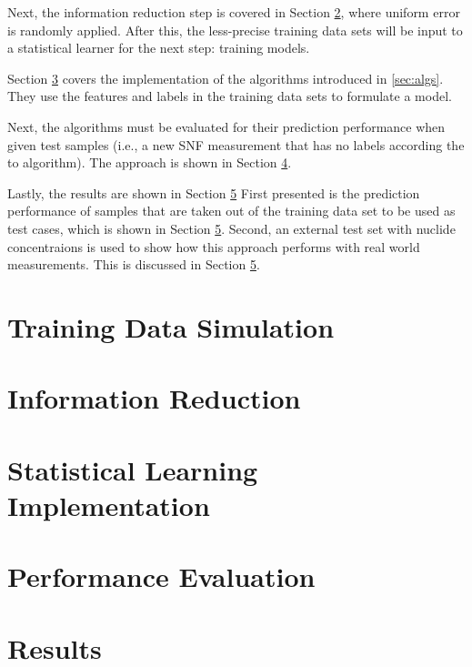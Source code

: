 Next, the information reduction step is covered in Section
\ref{sec:inforeduc1}, where uniform error is randomly applied. After this, the
less-precise training data sets will be input to a statistical learner for the
next step: training models.

Section \ref{sec:statmodel1} covers the implementation of the algorithms
introduced in \ref{sec:algs}. They use the features and labels in the training
data sets to formulate a model. 

Next, the algorithms must be evaluated for their prediction performance when
given test samples (i.e., a new \gls{SNF} measurement that has no labels
according the to algorithm).  The approach is shown in Section \ref{sec:eval1}.

Lastly, the results are shown in Section \ref{sec:results1} First presented is
the prediction performance of samples that are taken out of the training data
set to be used as test cases, which is shown in Section \ref{sec:results1}.
Second, an external test set with nuclide concentraions is used to show how
this approach performs with real world measurements. This is discussed in
Section \ref{sec:results1}.  

\section{Training Data Simulation}
\label{sec:training1}


\section{Information Reduction}
\label{sec:inforeduc1}


\section{Statistical Learning Implementation}
\label{sec:statmodel1}


\section{Performance Evaluation}
\label{sec:eval1}


\section{Results}
\label{sec:results1}

